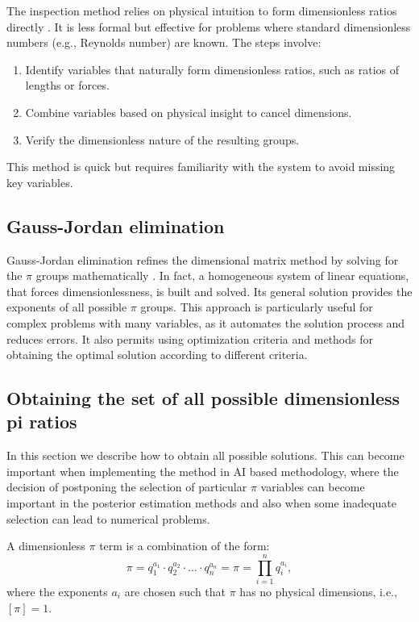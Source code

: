 The inspection method relies on physical intuition to form dimensionless ratios directly \cite{white2011}. It is less formal but effective for problems where standard dimensionless numbers (e.g., Reynolds number) are known. The steps involve:
\begin{enumerate}
    \item Identify variables that naturally form dimensionless ratios, such as ratios of lengths or forces.
    \item Combine variables based on physical insight to cancel dimensions.
    \item Verify the dimensionless nature of the resulting groups.
\end{enumerate}
This method is quick but requires familiarity with the system to avoid missing key variables.

\subsection{Gauss-Jordan elimination}
\label{subsec:gauss}

Gauss-Jordan elimination refines the dimensional matrix method by solving for the $\pi$ groups mathematically \cite{Sonin2004}. In fact, a homogeneous system of linear equations, that forces dimensionlessness, is built and solved. Its general solution provides the exponents of all possible $\pi$ groups. This approach is particularly useful for complex problems with many variables, as it automates the solution process and reduces errors. It also permits using optimization criteria and methods for obtaining the optimal solution according to different criteria.

\subsection{Obtaining the set of all possible dimensionless pi ratios}
In this section we describe how to obtain all possible solutions. This can become important when implementing the method in AI based methodology, where the decision of postponing the selection of particular $\pi$ variables can become important in the posterior estimation methods and also when some inadequate selection can lead to numerical problems.

\begin{definition}
A dimensionless $\pi$ term is a combination of the form:
\begin{equation}\label{epidef}
\pi = q_1^{a_1} \cdot q_2^{a_2} \cdot \ldots \cdot q_n^{a_n} = \pi =\prod\limits_{i=1}^{n} q_i^{a_i},
\end{equation}
where the exponents $a_i$ are chosen such that $\pi$ has no physical dimensions, i.e., $[\pi] = 1$.
\end{definition}


